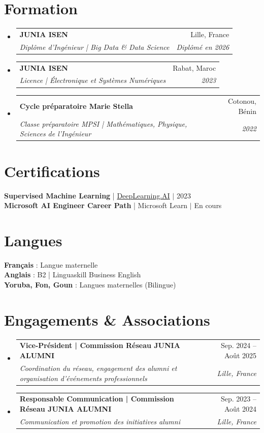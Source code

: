 \documentclass[letterpaper,11pt]{article}
\makeatletter
\newcommand{\resumeSubheading}[4]{
  \vspace{1pt}\item
    \begin{tabular*}{0.97\textwidth}[t]{l@{\extracolsep{\fill}}r}
      {\color{primary}\textbf{#1}} & #2 \\
      \textit{\small#3} & \textit{\small #4} \\
    \end{tabular*}\vspace{-4pt}
}
\newcommand{\resumeSubHeadingListStart}{\begin{itemize}[leftmargin=0.15in, label={}]}
\newcommand{\resumeSubHeadingListEnd}{\end{itemize}}
\makeatother
\begin{document}
\section{Formation}
\resumeSubHeadingListStart
  \resumeSubheading
    {JUNIA ISEN}{Lille, France}
    {Diplôme d'Ingénieur | Big Data \& Data Science}{Diplômé en 2026}
  \resumeSubheading
    {JUNIA ISEN}{Rabat, Maroc}
    {Licence | Électronique et Systèmes Numériques}{2023}
  \resumeSubheading
    {Cycle préparatoire Marie Stella}{Cotonou, Bénin}
    {Classe préparatoire MPSI | Mathématiques, Physique, Sciences de l'Ingénieur}{2022}
\resumeSubHeadingListEnd

\section{Certifications}
\begin{itemize}[leftmargin=0.15in, label={}]
\small{\item{
\textbf{Supervised Machine Learning} | \href{https://www.coursera.org/learn/machine-learning}{DeepLearning.AI} $|$ 2023 \vspace{1.5pt} \\
\textbf{Microsoft AI Engineer Career Path} | Microsoft Learn $|$ En cours
}}
\end{itemize}

\section{Langues}
\begin{itemize}[leftmargin=0.15in, label={}]
  \small{\item{
   \textbf{Français} : Langue maternelle \vspace{1.5pt} \\
   \textbf{Anglais} : B2 | Linguaskill Business English \vspace{1.5pt} \\
   \textbf{Yoruba, Fon, Goun} : Langues maternelles (Bilingue)
  }}
\end{itemize}

\section{Engagements \& Associations}
\resumeSubHeadingListStart
  \resumeSubheading
    {Vice-Président | Commission Réseau JUNIA ALUMNI}{Sep. 2024 -- Août 2025}
    {Coordination du réseau, engagement des alumni et organisation d'événements professionnels}{Lille, France}

  \resumeSubheading
    {Responsable Communication | Commission Réseau JUNIA ALUMNI}{Sep. 2023 -- Août 2024}
    {Communication et promotion des initiatives alumni}{Lille, France}
\resumeSubHeadingListEnd
\end{document}
